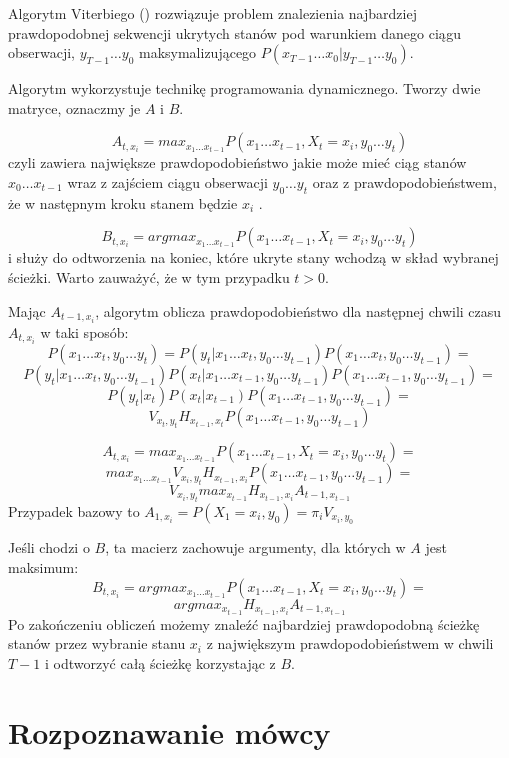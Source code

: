 Algorytm Viterbiego () rozwiązuje problem znalezienia najbardziej prawdopodobnej sekwencji ukrytych stanów pod warunkiem danego ciągu obserwacji, $y_{T-1} \dots y_0$ maksymalizującego $P(x_{T-1} \dots x_0 | y_{T-1} \dots y_0)$.

Algorytm wykorzystuje technikę programowania dynamicznego. Tworzy dwie matryce, oznaczmy je $A$ i $B$.

$$A_{t,x_i} = max_{x_1 \dots x_{t-1}} P(x_1 \dots x_{t-1}, X_t = x_i, y_0 \dots y_t)$$
czyli zawiera największe prawdopodobieństwo jakie może mieć ciąg stanów $x_0 \dots x_{t-1}$ wraz z zajściem ciągu obserwacji $y_0 \dots y_t$ oraz z prawdopodobieństwem, że w następnym kroku stanem będzie $x_i$ .

$$B_{t,x_i} = argmax_{x_1 \dots x_{t-1}} P(x_1 \dots x_{t-1}, X_t = x_i, y_0 \dots y_t)$$ i służy do odtworzenia na koniec, które ukryte stany wchodzą w skład wybranej ścieżki. Warto zauważyć, że w tym przypadku $t > 0$.

Mając $A_{t-1,x_i}$, algorytm oblicza prawdopodobieństwo dla następnej chwili czasu $A_{t,x_i}$ w taki sposób:
$$P(x_1 \dots x_t, y_0 \dots y_t) = P(y_t | x_1 \dots x_t, y_0 \dots y_{t-1}) P(x_1 \dots x_t, y_0 \dots y_{t-1}) =$$
$$P(y_t | x_1 \dots x_t, y_0 \dots y_{t-1}) P(x_t | x_1 \dots x_{t-1}, y_0 \dots y_{t-1}) P(x_1 \dots x_{t-1}, y_0 \dots y_{t-1}) =$$
$$P(y_t | x_t) P(x_t | x_{t-1}) P(x_1 \dots x_{t-1}, y_0 \dots y_{t-1}) =$$
$$V_{x_t, y_t} H_{x_{t-1}, x_t} P(x_1 \dots x_{t-1}, y_0 \dots y_{t-1})$$

$$A_{t,x_i} = max_{x_1 \dots x_{t-1}} P(x_1 \dots x_{t-1}, X_t = x_i, y_0 \dots y_t) =$$
$$max_{x_1 \dots x_{t-1}} V_{x_i, y_t} H_{x_{t-1}, x_i} P(x_1 \dots x_{t-1}, y_0 \dots y_{t-1}) =$$
$$V_{x_i, y_t} max_{x_{t-1}}H_{x_{t-1}, x_i} A_{t-1, x_{t-1}}$$
Przypadek bazowy to $A_{1,x_i} = P(X_1 = x_i, y_0) = \pi_i V_{x_i, y_0}$

Jeśli chodzi o $B$, ta macierz zachowuje argumenty, dla których w $A$ jest maksimum:
$$B_{t, x_i} = argmax_{x_1 \dots x_{t-1}} P(x_1 \dots x_{t-1}, X_t = x_i, y_0 \dots y_t) =$$
$$argmax_{x_{t-1}} H_{x_{t-1}, x_i} A_{t-1, x_{t-1}}$$
Po zakończeniu obliczeń możemy znaleźć najbardziej prawdopodobną ścieżkę stanów przez wybranie stanu $x_i$ z największym prawdopodobieństwem w chwili $T-1$ i odtworzyć całą ścieżkę korzystając z $B$\cite{aTutorialOnHidden}.

\section{Rozpoznawanie mówcy}\label{sec:rozpoznawanie_mowcy}

